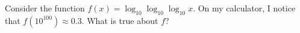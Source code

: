 \documentclass{ximera}
\begin{document}

\begin{problem}
  Consider the function $f(x) = \log_{10} \log_{10} \log_{10} x$.  On my calculator, I notice that $f(10^{100}) \approx 0.3$.  What is true about $f$?
  \begin{multipleChoice}
  \end{multipleChoice}  
\end{problem}
\end{document}
